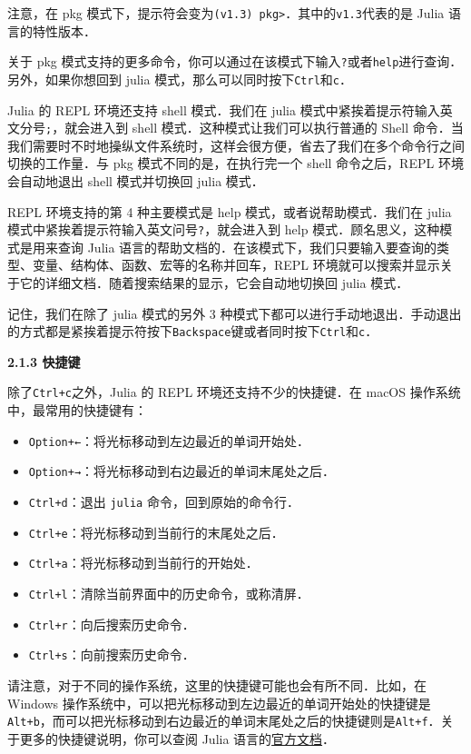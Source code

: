 注意，在 pkg 模式下，提示符会变为\verb|(v1.3) pkg>|．其中的\verb|v1.3|代表的是 Julia 语言的特性版本．

关于 pkg 模式支持的更多命令，你可以通过在该模式下输入\verb|?|或者\verb|help|进行查询．另外，如果你想回到 julia 模式，那么可以同时按下\verb|Ctrl|和\verb|c|．

Julia 的 REPL 环境还支持 shell 模式．我们在 julia 模式中紧挨着提示符输入英文分号\verb|;|，就会进入到 shell 模式．这种模式让我们可以执行普通的 Shell 命令．当我们需要时不时地操纵文件系统时，这样会很方便，省去了我们在多个命令行之间切换的工作量．与 pkg 模式不同的是，在执行完一个 shell 命令之后，REPL 环境会自动地退出 shell 模式并切换回 julia 模式．

REPL 环境支持的第 4 种主要模式是 help 模式，或者说帮助模式．我们在 julia 模式中紧挨着提示符输入英文问号\verb|?|，就会进入到 help 模式．顾名思义，这种模式是用来查询 Julia 语言的帮助文档的．在该模式下，我们只要输入要查询的类型、变量、结构体、函数、宏等的名称并回车，REPL 环境就可以搜索并显示关于它的详细文档．随着搜索结果的显示，它会自动地切换回 julia 模式．

记住，我们在除了 julia 模式的另外 3 种模式下都可以进行手动地退出．手动退出的方式都是紧挨着提示符按下\verb|Backspace|键或者同时按下\verb|Ctrl|和\verb|c|．

\textbf{2.1.3 快捷键}

除了\verb|Ctrl+c|之外，Julia 的 REPL 环境还支持不少的快捷键．在 macOS 操作系统中，最常用的快捷键有：

\begin{itemize}
\item \verb|Option+←|：将光标移动到左边最近的单词开始处．
\item  \verb|Option+→|：将光标移动到右边最近的单词末尾处之后．
\item  \verb|Ctrl+d|：退出 \verb|julia| 命令，回到原始的命令行．
\item  \verb|Ctrl+e|：将光标移动到当前行的末尾处之后．
\item  \verb|Ctrl+a|：将光标移动到当前行的开始处．
\item  \verb|Ctrl+l|：清除当前界面中的历史命令，或称清屏．
\item  \verb|Ctrl+r|：向后搜索历史命令．
\item  \verb|Ctrl+s|：向前搜索历史命令．
\end{itemize}

请注意，对于不同的操作系统，这里的快捷键可能也会有所不同．比如，在 Windows 操作系统中，可以把光标移动到左边最近的单词开始处的快捷键是\verb|Alt+b|，而可以把光标移动到右边最近的单词末尾处之后的快捷键则是\verb|Alt+f|．关于更多的快捷键说明，你可以查阅 Julia 语言的\href{https://docs.julialang.org/en/v1/stdlib/REPL/#Key-bindings-1}{官方文档}．

